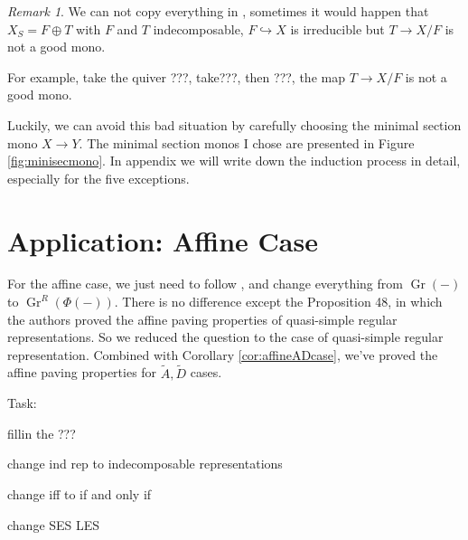 \documentclass[reqno,11pt]{amsart}
\numberwithin{equation}{section}
\theoremstyle{plain}
\theoremstyle{plain}
\numberwithin{equation}{section}
\theoremstyle{remark}
\newtheorem{remark}[theorem]{Remark}
\newcommand{\Gr}{\operatorname{Gr}}
\newcommand{\Grr}{\operatorname{Gr}^{R}}
\begin{document}
\begin{remark}
	We can not copy everything in \cite[Lemma 56]{irelli2019cell}, sometimes it would happen that $X_S=F \oplus T$ with $F$ and $T$ indecomposable, $F \hookrightarrow X$ is irreducible but $T \longrightarrow X/F$ is not a good mono.
	
	For example, take the quiver ???, take???, then ???, the map $T \longrightarrow X/F$ is not a good mono.
	
	Luckily, we can avoid this bad situation by carefully choosing the minimal section mono $X \longrightarrow Y$. The minimal section monos I chose are presented in Figure \ref{fig:minisecmono}. In appendix we will write down the induction process in detail, especially for the five exceptions.
\end{remark}
\section{Application: Affine Case}\label{sec:affine}
For the affine case, we just need to follow \cite[Section 6]{irelli2019cell}, and change everything from $\Gr(-)$ to $\Grr(\Phi(-))$. There is no difference except the Proposition 48, in which the authors proved the affine paving properties of quasi-simple regular representations. So we reduced the question to the case of quasi-simple regular representation. Combined with Corollary \ref{cor:affineADcase}, we've proved the affine paving properties for $\tilde{A},\tilde{D}$ cases.


Task:


fillin the ???

change ind rep to indecomposable representations

change iff to if and only if

change SES LES



\nocite{irelli2019cell}
\nocite{maksimau2019flag}
\end{document}
